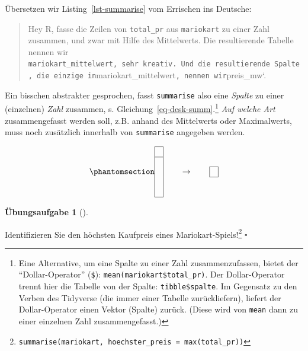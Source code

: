 \documentclass[
  a4paper,
  DIV=11]{scrreprt}
\theoremstyle{definition}
\newtheorem{exercise}{Übungsaufgabe}[chapter]
\theoremstyle{definition}
\theoremstyle{definition}
\theoremstyle{remark}
\begin{document}
Übersetzen wir Listing~\ref{lst-summarise} vom Errischen ins Deutsche:

\begin{quote}
{} Hey R, fasse die Zeilen von \texttt{total\_pr} aus
\texttt{mariokart} zu einer Zahl zusammen, und zwar mit Hilfe des
Mittelwerts. Die resultierende Tabelle nennen wir
\texttt{mariokart\_mittelwert,\ sehr\ kreativ.\ Und\ die\ resultierende\ Spalte,\ die\ einzige\ in}mariokart\_mittelwert\texttt{,\ nennen\ wir}preis\_mw`.
\end{quote}

Ein bisschen abstrakter gesprochen, fasst \texttt{summarise} also eine
\emph{Spalte} zu einer (einzelnen) \emph{Zahl} zusammen, s.
Gleichung~\ref{eq-desk-summ}.\footnote{Eine Alternative, um eine Spalte
  zu einer Zahl zusammenzufassen, bietet der ``Dollar-Operator''
  (\texttt{\$}): \texttt{mean(mariokart\$total\_pr)}. Der
  Dollar-Operator trennt hier die Tabelle von der Spalte:
  \texttt{tibble\$spalte}. Im Gegensatz zu den Verben des Tidyverse (die
  immer einer Tabelle zurückliefern), liefert der Dollar-Operator einen
  Vektor (Spalte) zurück. (Diese wird von \texttt{mean} dann zu einer
  einzelnen Zahl zusammengefasst.)} \emph{Auf welche Art}
zusammengefasst werden soll, z.B. anhand des Mittelwerts oder
Maximalwerts, muss noch zusätzlich innerhalb von \texttt{summarise}
angegeben werden.

\begin{equation}\phantomsection\label{eq-desk-summ}{\begin{array}{|c|} \hline \\ \hline \\  \\  \\ \\ \hline \end{array} \qquad \rightarrow  \qquad \begin{array}{|c|} \hline \\  \hline \end{array}}\end{equation}

\begin{exercise}[]\protect\hypertarget{exr-summarise}{}\label{exr-summarise}

Identifizieren Sie den höchsten Kaufpreis eines
Mariokart-Spiels!\footnote{\texttt{summarise(mariokart,\ hoechster\_preis\ =\ max(total\_pr))}}
\(\square\)

\end{exercise}
\end{document}
